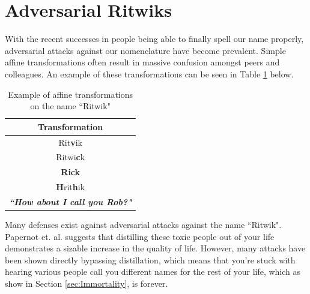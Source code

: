 \documentclass[]{article}
\begin{document}
\section{Adversarial Ritwiks}
With the recent successes in people being able to finally spell our name properly, adversarial attacks against our nomenclature have become prevalent. Simple affine transformations often result in massive confusion amongst peers and colleagues. An example of these transformations can be seen in Table \ref{table:affineadversarial} below.
\begin{table}[h]
\centering
\begin{tabular}{|c|}
	\hline 
	\textbf{Transformation}\\ 
	\hline 
	Rit\textbf{v}ik\\ 
	\hline 
	Ritwi\textbf{c}k\\
	\hline
	\textbf{Rick}\\
	\hline
	\textbf{H}rit\textbf{h}ik\\
	\hline
	\textbf{\textit{``How about I call you Rob?"}}\\
	\hline
\end{tabular}
\caption{Example of affine transformations on the name ``Ritwik"}
\label{table:affineadversarial}
\end{table}
Many defenses exist against adversarial attacks against the name ``Ritwik". Papernot et. al. \cite{Papernot} suggests that distilling these toxic people out of your life demonstrates a sizable increase in the quality of life. However, many attacks have been shown directly bypassing distillation, which means that you're stuck with hearing various people call you different names for the rest of your life, which as show in Section \ref{sec:Immortality}, is forever.




\end{document}
